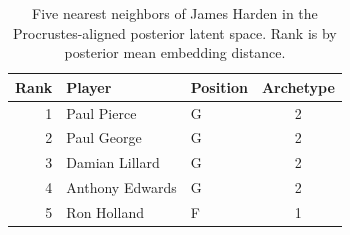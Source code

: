 \begin{table}[htbp]
  \centering\small
  \begin{tabular}{rllc}
    \toprule
    Rank & Player & Position & Archetype \\
    \midrule
    1 & Paul Pierce & G & 2 \\
    2 & Paul George & G & 2 \\
    3 & Damian Lillard & G & 2 \\
    4 & Anthony Edwards & G & 2 \\
    5 & Ron Holland & F & 1 \\
    \bottomrule
  \end{tabular}
  \caption{Five nearest neighbors of James Harden in the Procrustes-aligned posterior latent space. Rank is by posterior mean embedding distance.}
  \label{tab:James_Harden_neighbors}
\end{table}

